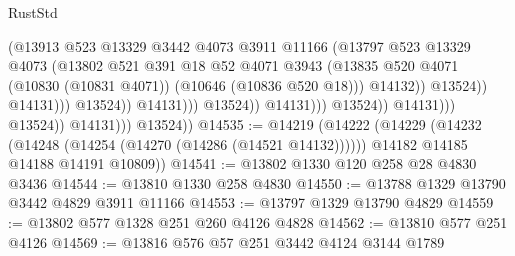 \begin{lexlean}{RustStd}
\begin{coremodule}
                                                        (@13913
                                                          @523
                                                          @13329
                                                          @3442
                                                          @4073
                                                          @3911
                                                          @11166
                                                          (@13797
                                                            @523
                                                            @13329
                                                            @4073
                                                            (@13802
                                                              @521
                                                              @391
                                                              @18
                                                              @52
                                                              @4071
                                                              @3943
                                                              (@13835
                                                                @520
                                                                @4071
                                                                (@10830 (@10831 @4071))
                                                                (@10646 (@10836 @520 @18)))
                                                              @14132))
                                                          @13524))
                                                      @14131)))
                                                @13524))
                                            @14131)))
                                      @13524))
                                  @14131)))
                            @13524))
                        @14131)))
                  @13524))
              @14131)))
        @13524))
@14535 := @14219
    (@14222
      (@14229
        (@14232 (@14248 (@14254 (@14270 (@14286 (@14521 @14132))))))
        @14182
        @14185
        @14188
        @14191
        @10809))
@14541 := @13802 @1330 @120 @258 @28 @4830 @3436
@14544 := @13810 @1330 @258 @4830
@14550 := @13788 @1329 @13790 @3442 @4829 @3911 @11166
@14553 := @13797 @1329 @13790 @4829
@14559 := @13802 @577 @1328 @251 @260 @4126 @4828
@14562 := @13810 @577 @251 @4126
@14569 := @13816 @576 @57 @251 @3442 @4124 @3144 @1789

\end{coremodule}
\end{lexlean}
